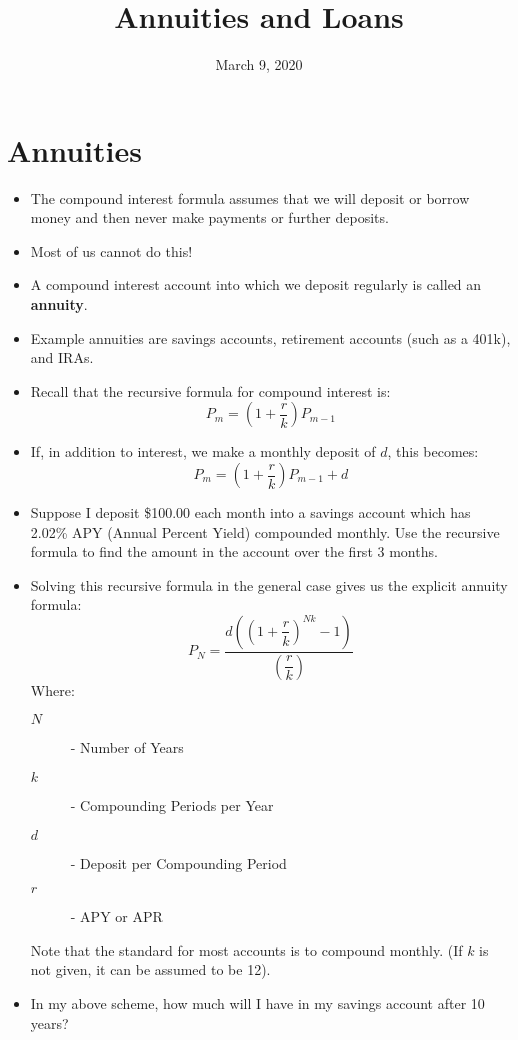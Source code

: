 \documentclass{article}
\title{Annuities and Loans}
\date{March 9, 2020}
\begin{document}
\maketitle

\section{Annuities}
\begin{itemize}
    \item The compound interest formula assumes that we will deposit
        or borrow money and then never make payments or further deposits.
    \item Most of us cannot do this!
    \item A compound interest account into which we deposit regularly
        is called an \textbf{annuity}.
    \item Example annuities are savings accounts, retirement accounts
        (such as a 401k), and IRAs.
    \item Recall that the recursive formula for compound interest is:
        \[
            P_m = \left(1+\dfrac{r}{k}\right) P_{m-1}
        \]
    \item If, in addition to interest, we make a monthly deposit of
        $d$, this becomes:
        \[
            P_m = \left(1+\dfrac{r}{k}\right) P_{m-1} + d
        \]
    \item Suppose I deposit \$100.00 each month into a savings account
        which has 2.02\% APY (Annual Percent Yield) compounded
        monthly.  Use the recursive formula to find the amount in the
        account over the first 3 months.
    \item Solving this recursive formula in the general case gives us
        the explicit annuity formula:
        \[
            P_N = \dfrac{d\left(\left(1+\dfrac{r}{k}\right)^{Nk} - 1 \right)}%
                        {\left(\dfrac{r}{k}\right)}
        \]
        Where:
        \begin{description}
            \item[$N$] - Number of Years
            \item[$k$] - Compounding Periods per Year
            \item[$d$] - Deposit per Compounding Period
            \item[$r$] - APY or APR
        \end{description}
        Note that the standard for most accounts is to compound
        monthly.  (If $k$ is not given, it can be assumed to be 12).

    \item In my above scheme, how much will I have in my savings
        account after 10 years?
\end{itemize}
\end{document}
